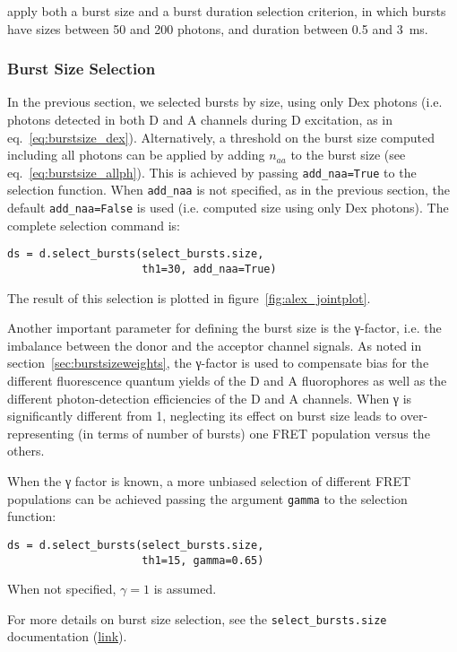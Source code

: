 apply both a burst size and a burst duration selection criterion, in which bursts
have sizes between 50 and 200 photons, and duration between 0.5 and 3~ms.

\subsubsection{Burst Size Selection}

In the previous section, we selected bursts by size, using only Dex photons
(i.e. photons detected in both D and A channels during D excitation, as in eq.~\ref{eq:burstsize_dex}).
Alternatively, a threshold on the burst size computed including all photons 
can be applied by adding $n_{aa}$ to the burst size (see eq.~\ref{eq:burstsize_allph}). 
This is achieved
by passing \verb|add_naa=True| to the selection function. When \verb|add_naa| is not specified,
as in the previous section, the default \verb|add_naa=False| is used
(i.e. computed size using only Dex photons). 
The complete selection command is:

\begin{lstlisting}
ds = d.select_bursts(select_bursts.size,
                     th1=30, add_naa=True)
\end{lstlisting}

\noindent The result of this selection is plotted in figure~\ref{fig:alex_jointplot}.

Another important parameter for defining the burst size is the γ-factor, i.e.
the imbalance between the donor and the acceptor channel signals. As noted in
section~\ref{sec:burstsizeweights}, the γ-factor is
used to compensate bias for the different fluorescence quantum yields of the D and A
fluorophores as well as the different photon-detection efficiencies of the D and A channels.
When γ is significantly different from 1, neglecting its effect on burst size leads to
over-representing (in terms of number of bursts) one FRET population versus the others.

When the γ factor is known, a more unbiased selection of different FRET
populations can be achieved passing the argument \verb|gamma| to the 
selection function:

\begin{lstlisting}
ds = d.select_bursts(select_bursts.size,
                     th1=15, gamma=0.65)
\end{lstlisting}

When not specified, $\gamma=1$ is assumed.

For more details on burst size selection, see the
\verb|select_bursts.size| documentation
(\href{http://fretbursts.readthedocs.org/en/latest/burst_selection.html#fretbursts.select_bursts.size}{link}).

